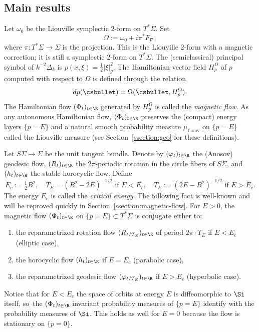 \subsection{Main results}

Let $\omega_0$ be the Liouville symplectic $2$-form on $T^*\Sigma$. Set
\[
\Omega := \omega_0 + i \pi^* F_\nabla,
\]
where $\pi : T^*\Sigma \to \Sigma$ is the projection. This is the Liouville $2$-form with a magnetic correction; it is still a symplectic $2$-form on $T^*\Sigma$. The (semiclassical) principal symbol of $k^{-2}\Delta_k$ is $p(x,\xi) = \tfrac{1}{2}|\xi|^2_g$. The Hamiltonian vector field $H_p^\Omega$ of $p$ computed with respect to $\Omega$ is defined through the relation
\[
dp(\csbullet) = \Omega(\csbullet, H^{\Omega}_p).
\]
The Hamiltonian flow $(\Phi_t)_{t \in \R}$ generated by $H_p^{\Omega}$ is called the \emph{magnetic flow}. As any autonomous Hamiltonian flow, $(\Phi_t)_{t \in \R}$ preserves the (compact) energy layers $\{p=E\}$ and a natural smooth probability measure $\mu_{\mathrm{Liouv}}$ on $\{p=E\}$ called the Liouville measure (see Section~\ref{ssection:geo} for these definitions).

Let $S\Sigma \to \Sigma$ be the unit tangent bundle. Denote by $(\varphi_t)_{t \in \R}$ the (Anosov) geodesic flow, $(R_t)_{t \in \R}$ the $2\pi$-periodic rotation in the circle fibers of $S\Sigma$, and $(h_t)_{t \in \R}$ the stable horocyclic flow. Define
\[
E_c := \tfrac{1}{2}B^2, \quad T_E = (B^2-2E)^{-1/2} \text{ if } E < E_c, \quad T_E := (2E-B^2)^{-1/2} \text{ if } E > E_c.
\]
The energy $E_c$ is called the \emph{critical energy}. The following fact is
well-known \cite{Arnold-61,Ginzburg-96} and will be reproved quickly in
Section~\ref{ssection:magnetic-flow}. For $E > 0$, the magnetic flow $(\Phi_t)_{t \in \R}$ on $\{p=E\}
\subset T^*\Sigma$ is conjugate either to:
\begin{enumerate}

\item the reparametrized rotation flow $(R_{t/T_E})_{t \in \R}$ of period
$2\pi \cdot T_E$ if $E < E_c$ (elliptic case),

\item the horocyclic flow $(h_t)_{t \in \R}$ if $E=E_c$ (parabolic case),

\item the reparametrized geodesic flow $(\varphi_{t/T_E})_{t \in \R}$ if $E>E_c$ (hyperbolic case).
\end{enumerate}
Notice that for $E < E_c$ the space of orbits at energy $E$ is diffeomorphic to $\Si$ itself, so~the $(\Phi_t)_{t \in \R}$ invariant probability measures of $\{ p = E\}$
identify with the probability measures of $\Si$. This holds as well for
$E=0$ because the flow is stationary on $\{ p =0 \}$.

